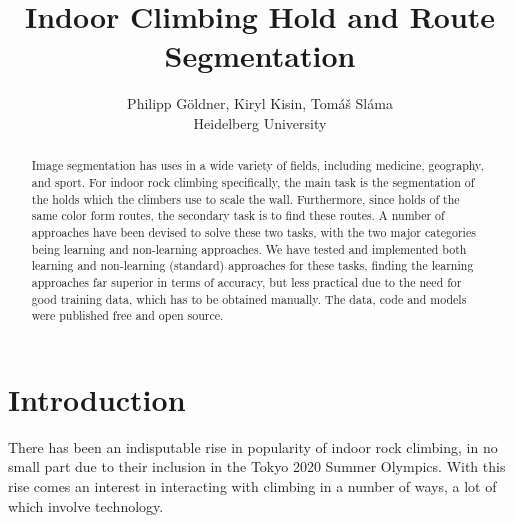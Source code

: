 \documentclass[final]{cvpr}
\begin{document}

\title{Indoor Climbing Hold and Route Segmentation}

\author{
\begin{tabular}{c}%
    Philipp Göldner, Kiryl Kisin, Tomáš Sláma \\
    Heidelberg University \\
    \\
\end{tabular}
}

\maketitle


\begin{abstract} %
   Image segmentation has uses in a wide variety of fields, including medicine, geography, and sport.
   For indoor rock climbing specifically, the main task is the segmentation of the holds which the climbers use to scale the wall.
   Furthermore, since holds of the same color form routes, the secondary task is to find these routes.
   A number of approaches have been devised to solve these two tasks, with the two major categories being learning and non-learning approaches.
   We have tested and implemented both learning and non-learning (standard) approaches for these tasks, finding the learning approaches far superior in terms of accuracy, but less practical due to the need for good training data, which has to be obtained manually.
   The data, code and models were published free and open source.
\end{abstract}

\section{Introduction} %
There has been an indisputable rise in popularity of indoor rock climbing, in no small part due to their inclusion in the Tokyo 2020 Summer Olympics.
With this rise comes an interest in interacting with climbing in a number of ways, a lot of which involve technology.
\end{document}
